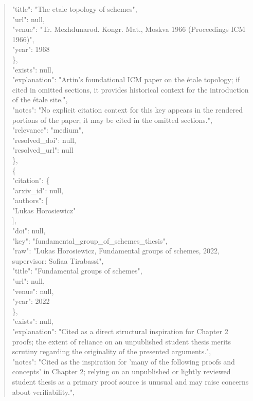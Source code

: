 \documentclass[11pt]{article}
\begin{document}
\begin{quote}
        "title": "The etale topology of schemes",\\
        "url": null,\\
        "venue": "Tr. Mezhdunarod. Kongr. Mat., Moskva 1966 (Proceedings ICM 1966)",\\
        "year": 1968\\
      \},\\
      "exists": null,\\
      "explanation": "Artin's foundational ICM paper on the étale topology; if cited in omitted sections, it provides historical context for the introduction of the étale site.",\\
      "notes": "No explicit citation context for this key appears in the rendered portions of the paper; it may be cited in the omitted sections.",\\
      "relevance": "medium",\\
      "resolved\_doi": null,\\
      "resolved\_url": null\\
    \},\\
    \{\\
      "citation": \{\\
        "arxiv\_id": null,\\
        "authors": [\\
          "Lukas Horosiewicz"\\
        ],\\
        "doi": null,\\
        "key": "fundamental\_group\_of\_schemes\_thesis",\\
        "raw": "Lukas Horosiewicz, Fundamental groups of schemes, 2022, supervisor: Sofiaa Tirabassi",\\
        "title": "Fundamental groups of schemes",\\
        "url": null,\\
        "venue": null,\\
        "year": 2022\\
      \},\\
      "exists": null,\\
      "explanation": "Cited as a direct structural inspiration for Chapter 2 proofs; the extent of reliance on an unpublished student thesis merits scrutiny regarding the originality of the presented arguments.",\\
      "notes": "Cited as the inspiration for 'many of the following proofs and concepts' in Chapter 2; relying on an unpublished or lightly reviewed student thesis as a primary proof source is unusual and may raise concerns about verifiability.",\\

\end{quote}
\end{document}
